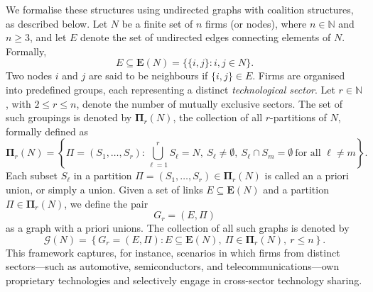 \documentclass[preprint,11pt,authoryear]{elsarticle}
\theoremstyle{plain}
\begin{document}
We formalise these structures using undirected graphs with coalition structures, as described below.
Let \( N \) be a finite set of \( n \) firms (or nodes), where \( n \in \mathbb{N} \) and \( n \geq 3 \), and let \( E \) denote the set of undirected edges connecting elements of \( N \). Formally,
\[
E \subseteq \mathbf{E}(N) = \big\{ \{i, j\} : i, j \in N \big\}.
\]
Two nodes \( i \) and \( j \) are said to be neighbours if \( \{i, j\} \in E \).
Firms are organised into predefined groups, each representing a distinct \emph{technological sector}. Let \( r \in \mathbb{N} \), with \( 2 \leq r \leq n \), denote the number of mutually exclusive sectors. The set of such groupings is denoted by \( \mathbf{\Pi}_r(N) \), the collection of all \( r \)-partitions of \( N \), formally defined as
\[
\mathbf{\Pi}_r(N) = \left\{ \Pi = (S_1, \ldots, S_r) : \bigcup_{\ell=1}^r S_\ell = N,\ S_\ell \neq \emptyset,\ S_\ell \cap S_m = \emptyset\ \text{for all } \ell \neq m \right\}.
\]
Each subset \( S_\ell \) in a partition \( \Pi = (S_1, \ldots, S_r) \in \mathbf{\Pi}_r(N) \) is called an a priori union, or simply a union.
Given a set of links \( E \subseteq \mathbf{E}(N) \) and a partition \( \Pi \in \mathbf{\Pi}_r(N) \), we define the pair
\[
G_r = (E, \Pi)
\]
as a graph with a priori unions. The collection of all such graphs is denoted by
\[
\mathcal{G}(N) = \left\{ G_r = (E, \Pi) : E \subseteq \mathbf{E}(N),\ \Pi \in \mathbf{\Pi}_r(N),\ r \leq n \right\}.
\]
This framework captures, for instance, scenarios in which firms from distinct sectors—such as automotive, semiconductors, and telecommunications—own proprietary technologies and selectively engage in cross-sector technology sharing.
\end{document}
